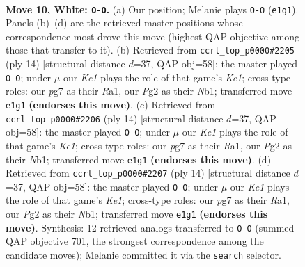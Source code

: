 \documentclass[11pt]{article}
\begin{document}
\clearpage

\begin{figure}[p]\centering
\begin{subfigure}{0.46\textwidth}\centering
\resizebox{\linewidth}{!}{%
\newchessgame
\chessboard[
  setfen={r1bqkb1r/pp3ppp/2npp3/3BP3/3P3P/5N2/PP3PP1/RNBQK2R w KQq - 0 10},
  showmover=false,
  pgfstyle=straightmove, color=movearrow, markmove={e1-g1}
]}
\caption{}
\end{subfigure}\hfill
\begin{subfigure}{0.46\textwidth}\centering
\resizebox{\linewidth}{!}{%
\newchessgame
\chessboard[
  setfen={r1bqkb1r/pp3ppp/2npp3/3nP3/2BP4/5N2/PP3PPP/RNBQK2R w KQkq - 0 8},
  showmover=false,
  pgfstyle=straightmove, color=movearrow, markmove={e1-g1}
]}
\caption{}
\end{subfigure}
\\[4pt]
\begin{subfigure}{0.46\textwidth}\centering
\resizebox{\linewidth}{!}{%
\newchessgame
\chessboard[
  setfen={r1bqkb1r/pp3ppp/2npp3/3nP3/2BP4/5N2/PP3PPP/RNBQK2R w KQkq - 0 8},
  showmover=false,
  pgfstyle=straightmove, color=movearrow, markmove={e1-g1}
]}
\caption{}
\end{subfigure}\hfill
\begin{subfigure}{0.46\textwidth}\centering
\resizebox{\linewidth}{!}{%
\newchessgame
\chessboard[
  setfen={r1bqkb1r/pp3ppp/2npp3/3nP3/2BP4/5N2/PP3PPP/RNBQK2R w KQkq - 0 8},
  showmover=false,
  pgfstyle=straightmove, color=movearrow, markmove={e1-g1}
]}
\caption{}
\end{subfigure}
\caption{\textbf{Move 10, White: \texttt{O-O}.} (a) Our position; Melanie plays \texttt{O-O} (\texttt{e1g1}). Panels (b)--(d) are the retrieved master positions whose correspondence most drove this move (highest QAP objective among those that transfer to it). (b) Retrieved from \texttt{ccrl\_top\_p0000\#2205} (ply 14) [structural distance $d$=37, QAP obj=58]: the master played \texttt{O-O}; under $\mu$ our \emph{Ke1} plays the role of that game's \emph{Ke1}; cross-type roles: our \emph{p}g7 as their \emph{R}a1, our \emph{P}g2 as their \emph{N}b1; transferred move \texttt{e1g1} \textbf{(endorses this move)}. (c) Retrieved from \texttt{ccrl\_top\_p0000\#2206} (ply 14) [structural distance $d$=37, QAP obj=58]: the master played \texttt{O-O}; under $\mu$ our \emph{Ke1} plays the role of that game's \emph{Ke1}; cross-type roles: our \emph{p}g7 as their \emph{R}a1, our \emph{P}g2 as their \emph{N}b1; transferred move \texttt{e1g1} \textbf{(endorses this move)}. (d) Retrieved from \texttt{ccrl\_top\_p0000\#2207} (ply 14) [structural distance $d$=37, QAP obj=58]: the master played \texttt{O-O}; under $\mu$ our \emph{Ke1} plays the role of that game's \emph{Ke1}; cross-type roles: our \emph{p}g7 as their \emph{R}a1, our \emph{P}g2 as their \emph{N}b1; transferred move \texttt{e1g1} \textbf{(endorses this move)}. Synthesis: 12 retrieved analogs transferred to \texttt{O-O} (summed QAP objective 701, the strongest correspondence among the candidate moves); Melanie committed it via the \texttt{search} selector.}
\label{fig:thought-m18}
\end{figure}
\end{document}
